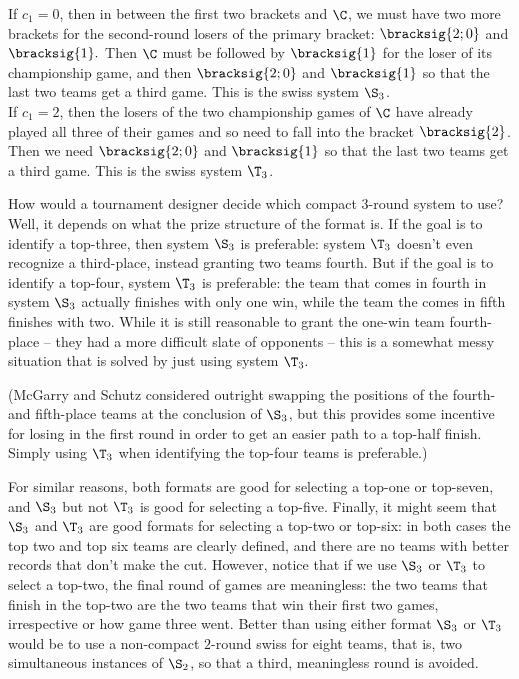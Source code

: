 {{         If $c_1 = 0$, then in between the first two brackets and $\C$, we must have two more brackets for the second-round losers of the primary bracket: $\bracksig{2;0}$ and $\bracksig{1}.$ Then $\C$ must be followed by $\bracksig{1}$ for the loser of its championship game, and then $\bracksig{2;0}$ and $\bracksig{1}$ so that the last two teams get a third game. This is the swiss system $\S_3$.\\
        
         If $c_1 = 2$, then the losers of the two championship games of $\C$ have already played all three of their games and so need to fall into the bracket $\bracksig{2}$. Then we need $\bracksig{2;0}$ and $\bracksig{1}$ so that the last two teams get a third game. This is the swiss system $\T_3$.
    }{}

    
    How would a tournament designer decide which compact 3-round system to use? Well, it depends on what the prize structure of the format is. If the goal is to identify a top-three, then system $\S_3$ is preferable: system $\T_3$ doesn't even recognize a third-place, instead granting two teams fourth. But if the goal is to identify a top-four, system $\T_3$ is preferable: the team that comes in fourth in system $\S_3$ actually finishes with only one win, while the team the comes in fifth finishes with two. While it is still reasonable to grant the one-win team fourth-place -- they had a more difficult slate of opponents -- this is a somewhat messy situation that is solved by just using system $\T_3.$
    
    (McGarry and Schutz \cite{four_five_swap} considered outright swapping the positions of the fourth- and fifth-place teams at the conclusion of $\S_3$, but this provides some incentive for losing in the first round in order to get an easier path to a top-half finish. Simply using $\T_3$ when identifying the top-four teams is preferable.)

    For similar reasons, both formats are good for selecting a top-one or top-seven, and $\S_3$ but not $\T_3$ is good for selecting a top-five. Finally, it might seem that $\S_3$ and $\T_3$ are good formats for selecting a top-two or top-six: in both cases the top two and top six teams are clearly defined, and there are no teams with better records that don't make the cut. However, notice that if we use $\S_3$ or $\T_3$ to select a top-two, the final round of games are meaningless: the two teams that finish in the top-two are the two teams that win their first two games, irrespective or how game three went. Better than using either format $\S_3$ or $\T_3$ would be to use a non-compact $2$-round swiss for eight teams, that is, two simultaneous instances of $\S_2$, so that a third, meaningless round is avoided.

}
